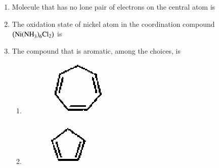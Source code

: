 \documentclass[journal,12pt,onecolumn]{IEEEtran}
\theoremstyle{remark}
\begin{document}
\begin{enumerate}
\item Molecule that has no lone pair of electrons on the central atom  is  

\hfill{}

\begin{enumerate}
\end{enumerate}

\item The oxidation state of nickel atom in the coordination compound $\brak{\text{Ni(NH}_3\text{)}_6\text{Cl}_2}$ is  

\hfill{}

\begin{enumerate}
\end{enumerate}

\item The compound that is aromatic, among the choices, is  

\hfill{}
\begin{enumerate}
\item 
\begin{figure}[h!]
\centering
\includegraphics[width=0.2\columnwidth]{fig1.png}
\caption*{}
\label{fig:a5a}
\end{figure}

\item 
\begin{figure}[h!]
\centering
\includegraphics[width=0.2\columnwidth]{fig2.png}
\caption*{}
\label{fig:a5b}
\end{figure}


\end{enumerate}
\end{enumerate}
\end{document}
